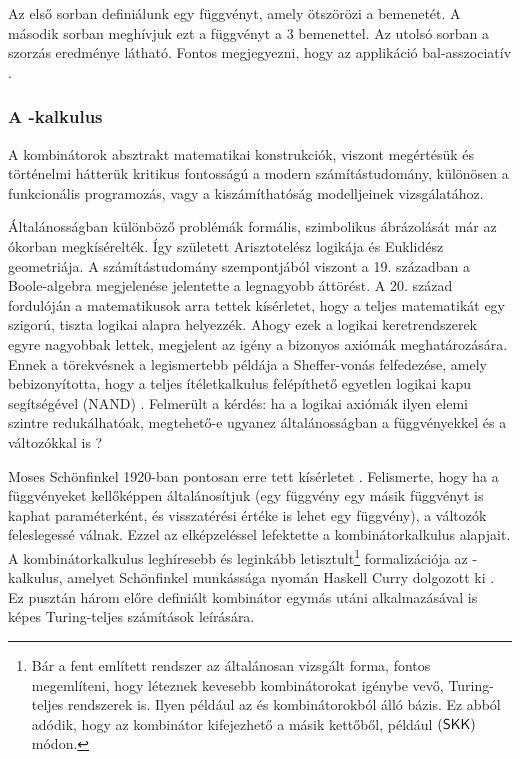 \documentclass[a4paper,oneside]{article}
\begin{document}
Az első sorban definiálunk egy függvényt, amely ötszörözi a bemenetét. A második sorban meghívjuk ezt a függvényt a $3$ bemenettel. Az utolsó sorban a szorzás eredménye látható. Fontos megjegyezni, hogy az applikáció bal-asszociatív \cite{pierceTypesProgrammingLanguages2002a}.

\subsubsection{A \ski-kalkulus}
\label{sec:a-ski-kalkulus-def}

A kombinátorok absztrakt matematikai konstrukciók, viszont megértésük és történelmi hátterük kritikus fontosságú a modern számítástudomány, különösen a funkcionális programozás, vagy a kiszámíthatóság modelljeinek vizsgálatához.

Általánosságban különböző problémák formális, szimbolikus ábrázolását már az ókorban megkísérelték. Így született Arisztotelész logikája és Euklidész geometriája. A számítástudomány szempontjából viszont a 19. században a Boole-algebra megjelenése jelentette a legnagyobb áttörést. A 20. század fordulóján a matematikusok arra tettek kísérletet, hogy a teljes matematikát egy szigorú, tiszta logikai alapra helyezzék. Ahogy ezek a logikai keretrendszerek egyre nagyobbak lettek, megjelent az igény a bizonyos axiómák meghatározására. Ennek a törekvésnek a legismertebb példája a Sheffer-vonás felfedezése, amely bebizonyította, hogy a teljes ítéletkalkulus felépíthető egyetlen logikai kapu segítségével (NAND) \cite{shefferSetFiveIndependent1913}. Felmerült a kérdés: ha a logikai axiómák ilyen elemi szintre redukálhatóak, megtehető-e ugyanez általánosságban a függvényekkel és a változókkal is \cite{pierceTypesProgrammingLanguages2002a}?

Moses Schönfinkel 1920-ban pontosan erre tett kísérletet \cite{schoenfinkelUeberBausteineMathematischen1924}. Felismerte, hogy ha a függvényeket kellőképpen általánosítjuk (egy függvény egy másik függvényt is kaphat paraméterként, és visszatérési értéke is lehet egy függvény), a változók feleslegessé válnak. Ezzel az elképzeléssel lefektette a kombinátorkalkulus  alapjait. A kombinátorkalkulus leghíresebb és leginkább letisztult\footnote{Bár a fent említett \ski rendszer az általánosan vizsgált forma, fontos megemlíteni, hogy léteznek kevesebb kombinátorokat igénybe vevő, Turing-teljes rendszerek is. Ilyen például az \Scomb és \Kcomb kombinátorokból álló bázis. Ez abból adódik, hogy az \Icomb kombinátor kifejezhető a másik kettőből, például \(\left(\textsf{S}\textsf{K}\textsf{K}\right)\) módon.} formalizációja az \ski-kalkulus, amelyet Schönfinkel munkássága nyomán Haskell Curry dolgozott ki \cite{curryGrundlagenKombinatorischenLogik1930}. Ez pusztán három előre definiált kombinátor egymás utáni alkalmazásával is képes Turing-teljes számítások leírására.
\end{document}
